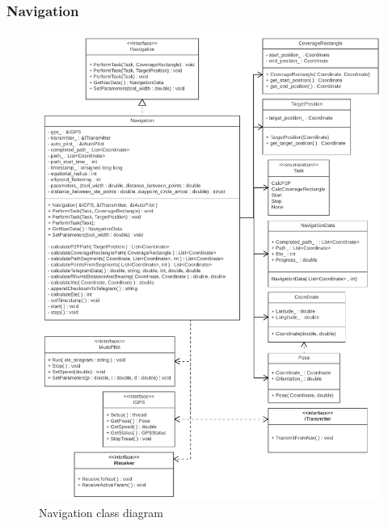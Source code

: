 \subsubsection{Navigation}

\begin{figure}[H]
\centering
\includegraphics[width=1\linewidth]{Images/Design/Navigation_class_diagram}
\caption{Navigation class diagram}
\label{fig:Navigation}
\end{figure}

